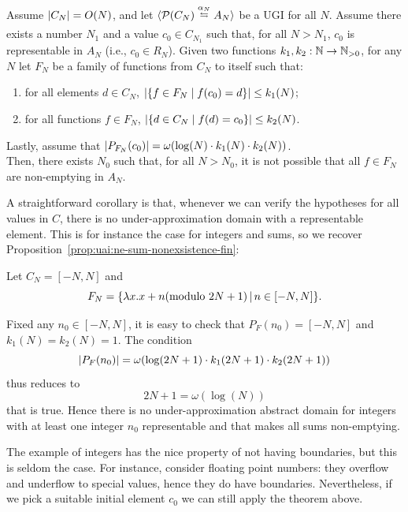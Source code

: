 \begin{theorem}\label{th:uai:non-empt-res-finite-global}
	Assume $\lvert C_N\rvert = O(N)$, and let $\ugi{\pow(C_N)}{\alpha_N}{A_N}$ be a UGI for all $N$.
	Assume there exists a number $N_1$ and a value $c_0 \in C_{N_1}$ such that, for all $N > N_1$, $c_0$ is representable in $A_N$ (i.e., $c_0 \in R_{N}$).
	Given  two functions $k_1, k_2 : \mathbb{N} \rightarrow \mathbb{N}_{>0}$, for any $N$
	let $F_N$ be a family of functions from $C_N$ to itself such that:
	\begin{enumerate}
		\item for all elements $d \in C_N$, $\lvert\{f \in F_N \mid f(c_0) = d \}\rvert \leq k_1(N)$;
		\item for all functions $f \in F_N$, $\lvert\{d \in C_N \mid f(d) = c_0\}\rvert \leq k_2(N)$.
	\end{enumerate}
	Lastly, assume that $\lvert P_{F_N}(c_0)\rvert = \omega(\log(N) \cdot k_1(N) \cdot k_2(N))$.\\
	Then, there exists $N_0$ such that, for all $N > N_0$, it is not possible that all $f \in F_N$ are non-emptying in $A_N$.
\end{theorem}

A straightforward corollary is that, whenever we can verify the hypotheses for all values in $C$, there is no under-approximation domain with a representable element. This is for instance the case for integers and sums, so we recover Proposition~\ref{prop:uai:ne-sum-nonexsistence-fin}:
\begin{example}
	Let $C_N = [-N, N]$ and
	\[
	F_N = \{ \lambda x. x + n (\text{modulo } 2N+1) \,\vert\, n \in [-N, N] \} .
	\]

	Fixed any $n_0 \in [-N, N]$, it is easy to check that $P_F(n_0) = [-N, N]$ and $k_1(N) = k_2(N) = 1$. The condition
	\[
	\lvert P_F(n_0)\rvert = \omega(\log(2N + 1) \cdot k_1(2N + 1) \cdot k_2(2N + 1))
	\]
	thus reduces to
	\[
	2N + 1 = \omega(\log(N))
	\]
	that is true. Hence there is no under-approximation abstract domain for integers with at least one integer $n_0$ representable and that makes all sums non-emptying.
\end{example}
The example of integers has the nice property of not having boundaries, but this is seldom the case. For instance, consider floating point numbers: they overflow and underflow to special values, hence they do have boundaries. Nevertheless, if we pick a suitable initial element $c_0$ we can still apply the theorem above.

